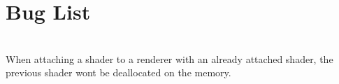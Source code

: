\chapter{Bug List }
\hypertarget{bug}{}\label{bug}

\begin{DoxyRefList}
\item[{\parbox[t]{\linewidth}{Member \doxylink{classSolaris_1_1Renderer_ac8cc018ddf805859fa3858c9cc06bb38}{Solaris::Renderer::Attach\+Shader} (\doxylink{classSolaris_1_1Shader}{Shader} \&shader)}}]\hfill \\
\label{bug__bug000001}%
%
When attaching a shader to a renderer with an already attached shader, the previous shader won\textquotesingle{}t be deallocated on the memory.
\end{DoxyRefList}
